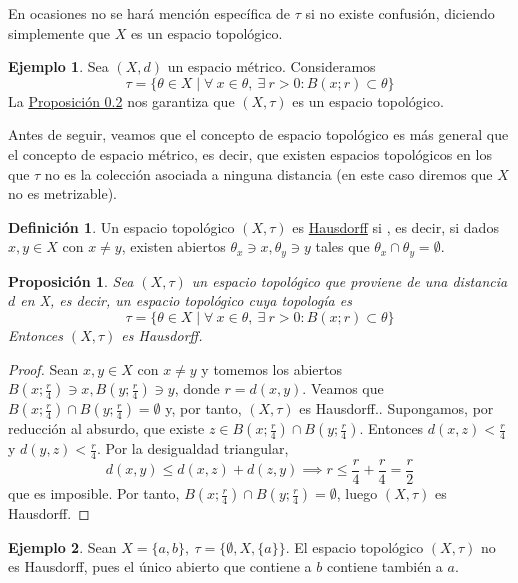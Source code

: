 \documentclass[12pt]{report}
\newtheorem{proposition}{Proposición}[chapter]
\theoremstyle{definition}
\newtheorem{definition}{Definición}[chapter]
\theoremstyle{definition}
\newtheorem{example}{Ejemplo}[chapter]
\theoremstyle{remark}
\begin{document}
\vspace{2mm}
En ocasiones no se hará mención específica de $\tau$ si no existe confusión, diciendo simplemente que $X$ es un espacio topológico.

\vspace{2mm}
\begin{example}
Sea $(X,d)$ un espacio métrico. Consideramos \[\tau = \{\theta \in X \mid \forall \ x \in \theta, \ \exists \ r>0 \colon B(x;r) \subset \theta\}\] La \hyperref[prop0.2.]{\color{blue}Proposición 0.2} nos garantiza que $(X,\tau)$ es un espacio topológico.
\end{example}

\vspace{2mm}
Antes de seguir, veamos que el concepto de espacio topológico es más general que el concepto de espacio métrico, es decir, que existen espacios topológicos en los que $\tau$ no es la colección asociada a ninguna distancia (en este caso diremos que $X$ no es metrizable).
\begin{definition}
Un espacio topológico $(X,\tau)$ es \underline{Hausdorff} si , es decir, si dados $x,y \in X$ con $x \neq y$, existen abiertos $\theta_x \ni x, \theta_y \ni y$ tales que $\theta_x \cap \theta_y = \emptyset$.
\end{definition}

\begin{proposition}
Sea $(X,\tau)$ un espacio topológico que proviene de una distancia $d$ en X, es decir, un espacio topológico cuya topología es \[\tau = \{\theta \in X \mid \forall \ x \in \theta, \ \exists \ r>0 \colon B(x;r) \subset \theta\}\] Entonces $(X,\tau)$ es Hausdorff.
\end{proposition}

\begin{proof}
Sean $x,y \in X$ con $x \neq y$ y tomemos los abiertos $B(x;\frac{r}{4}) \ni x, B(y;\frac{r}{4}) \ni y$, donde $r = d(x,y)$. Veamos que $B(x;\frac{r}{4}) \cap B(y;\frac{r}{4}) = \emptyset$ y, por tanto, $(X,\tau)$ es Hausdorff.. Supongamos, por reducción al absurdo, que existe $z \in B(x;\frac{r}{4}) \cap B(y;\frac{r}{4})$. Entonces $d(x,z)<\frac{r}{4}$ y $d(y,z)<\frac{r}{4}$. Por la desigualdad triangular, \[d(x,y) \leq d(x,z)+d(z,y) \implies r \leq \frac{r}{4}+\frac{r}{4}=\frac{r}{2}\]
que es imposible. Por tanto, $B(x;\frac{r}{4}) \cap B(y;\frac{r}{4}) = \emptyset$, luego $(X,\tau)$ es Hausdorff.
\end{proof}

\begin{example}
Sean $X = \{a,b\}, \ \tau = \{\emptyset, X, \{a\}\}$. El espacio topológico $(X,\tau)$ no es Hausdorff, pues el único abierto que contiene a $b$ contiene también a $a$.
\end{example}
\end{document}
